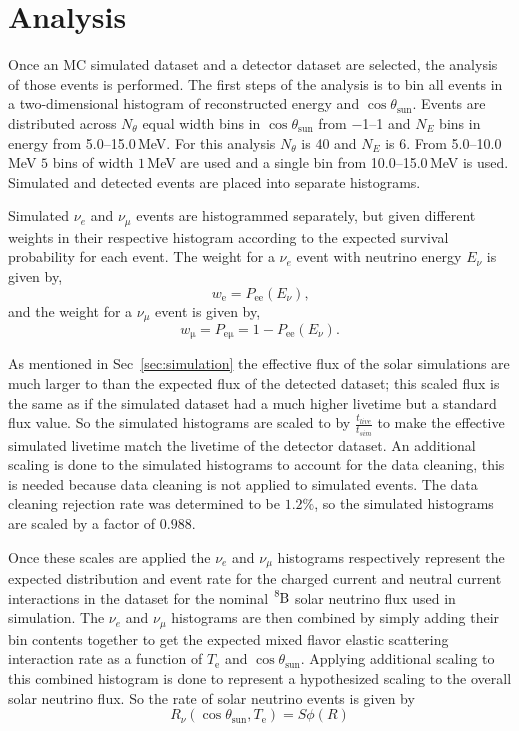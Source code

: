 \section{Analysis}
Once an MC simulated dataset and a detector dataset are selected, the analysis
of those events is performed.
The first steps of the analysis is to bin all events
in a two-dimensional histogram of reconstructed energy and $\cos\theta_{\mathrm{sun}}$.
Events are distributed across $N_{\theta}$ equal width bins in $\cos\theta_{\mathrm{sun}}$ from
\numrange{-1}{1} and
$N_{E}$ bins in energy from \numrange{5.0}{15.0}\,MeV.
For this analysis $N_{\theta}$ is 40 and $N_{E}$ is 6.
From \numrange{5.0}{10.0}\,MeV $5$ bins of width $1$\,MeV are used and
a single bin from \numrange{10.0}{15.0}\,MeV is used.
Simulated and detected events are placed into separate histograms.

Simulated $\nu_{e}$ and $\nu_{\mu}$ events are histogrammed separately,
but given different weights in their respective histogram according to the expected survival probability
for each event.
The weight for a $\nu_{e}$ event with neutrino energy $E_{\nu}$ is given by,
\begin{equation}
    w_{\mathrm{e}} = P_{\mathrm{ee}}(E_{\nu})\text{,}
\end{equation}
and the weight for a $\nu_{\mu}$ event is given by,
\begin{equation}
    w_{\mathrm{\mu}}= P_{\mathrm{e\mu}} = 1 - P_{\mathrm{ee}}(E_{\nu})\text{.}
\end{equation}

As mentioned in Sec~\ref{sec:simulation} the effective flux of the solar
simulations are much larger to than the expected flux of the detected dataset;
this scaled flux is the same as if the simulated dataset had a much higher livetime
but a standard flux value.
So the simulated histograms are
scaled to by $\frac{t_{live}}{t_{sim}}$ to make the effective simulated
livetime match the livetime of the detector dataset.
An additional scaling is done to the simulated histograms to account
for the data cleaning, this is needed because data cleaning
is not applied to simulated events.
The data cleaning rejection rate was determined to be $1.2\%$, so the
simulated histograms are scaled by a factor of $0.988$.

Once these scales are applied the $\nu_{e}$ and $\nu_{\mu}$ histograms
respectively  represent the expected distribution and event rate for the charged current
and neutral current interactions in the dataset for the nominal $\ce{^{8}B}$
solar neutrino flux used in simulation.
The $\nu_{e}$ and $\nu_{\mu}$ histograms are then combined by
simply adding their bin contents together to get the expected
mixed flavor elastic scattering interaction rate as a function
of $T_{\mathrm{e}}$ and $\cos\theta_{\mathrm{sun}}$.
Applying additional scaling to this combined histogram is done to represent
a hypothesized scaling to the overall solar neutrino flux.
So the rate of solar neutrino events is given by
\begin{equation}
    R_{\nu}(\cos\theta_{\mathrm{sun}}, T_{\mathrm{e}}) =
    S\phi(R)
    \label{eqn:solar_rate}
\end{equation}

